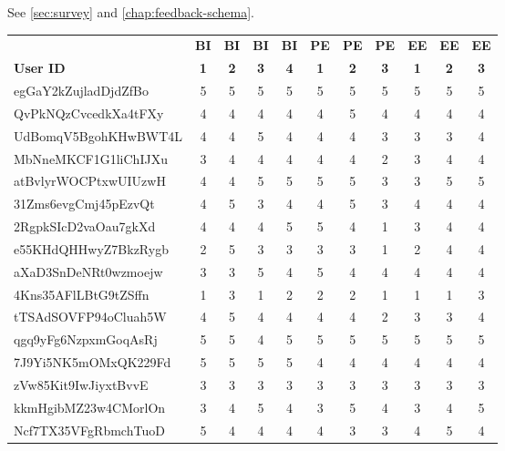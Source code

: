See \cref{sec:survey} and \cref{chap:feedback-schema}.

\begin{table}[H]
\begin{tabular}{|l|c|c|c|c|c|c|c|c|c|c|}
\hline
 & \textbf{BI} & \textbf{BI} & \textbf{BI} & \textbf{BI} & \textbf{PE} & \textbf{PE} & \textbf{PE} & \textbf{EE} & \textbf{EE} & \textbf{EE} \\
\textbf{User ID} & \textbf{1} & \textbf{2} & \textbf{3} & \textbf{4} & \textbf{1} & \textbf{2} & \textbf{3} & \textbf{1} & \textbf{2} & \textbf{3} \\ \hline

egGaY2kZujladDjdZfBo & 5 & 5 & 5 & 5 & 5 & 5 & 5 & 5 & 5 & 5 \\ \hline

QvPkNQzCvcedkXa4tFXy & 4 & 4 & 4 & 4 & 4 & 5 & 4 & 4 & 4 & 4 \\ \hline

UdBomqV5BgohKHwBWT4L & 4 & 4 & 5 & 4 & 4 & 4 & 3 & 3 & 3 & 4 \\ \hline

MbNneMKCF1G1liChIJXu & 3 & 4 & 4 & 4 & 4 & 4 & 2 & 3 & 4 & 4 \\ \hline

atBvlyrWOCPtxwUIUzwH & 4 & 4 & 5 & 5 & 5 & 5 & 3 & 3 & 5 & 5 \\ \hline

31Zms6evgCmj45pEzvQt & 4 & 5 & 3 & 4 & 4 & 5 & 3 & 4 & 4 & 4 \\ \hline

2RgpkSIcD2vaOau7gkXd & 4 & 4 & 4 & 5 & 5 & 4 & 1 & 3 & 4 & 4 \\ \hline

e55KHdQHHwyZ7BkzRygb & 2 & 5 & 3 & 3 & 3 & 3 & 1 & 2 & 4 & 4 \\ \hline

aXaD3SnDeNRt0wzmoejw & 3 & 3 & 5 & 4 & 5 & 4 & 4 & 4 & 4 & 4 \\ \hline

4Kns35AFlLBtG9tZSffn & 1 & 3 & 1 & 2 & 2 & 2 & 1 & 1 & 1 & 3 \\ \hline

tTSAdSOVFP94oCluah5W & 4 & 5 & 4 & 4 & 4 & 4 & 2 & 3 & 3 & 4 \\ \hline

qgq9yFg6NzpxmGoqAsRj & 5 & 5 & 4 & 5 & 5 & 5 & 5 & 5 & 5 & 5 \\ \hline

7J9Yi5NK5mOMxQK229Fd & 5 & 5 & 5 & 5 & 4 & 4 & 4 & 4 & 4 & 4 \\ \hline

zVw85Kit9IwJiyxtBvvE & 3 & 3 & 3 & 3 & 3 & 3 & 3 & 3 & 3 & 3 \\ \hline

kkmHgibMZ23w4CMorlOn & 3 & 4 & 5 & 4 & 3 & 5 & 4 & 3 & 4 & 5 \\ \hline

Ncf7TX35VFgRbmchTuoD & 5 & 4 & 4 & 4 & 4 & 3 & 3 & 4 & 5 & 4 \\ \hline
\end{tabular}
\end{table}

